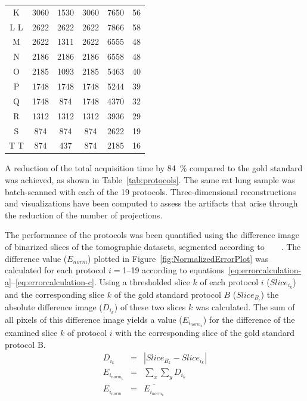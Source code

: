 \begin{table}
\begin{tabular}{cccccc}
		K & 3060 & 1530 & 3060 & 7650  &  56\\%
		\ifiucr
			\rowcolor{lightgray} L 
		\else
		 	L
		 \fi
		 & 2622 & 2622 & 2622 & 7866  &  58\\%
		M & 2622 & 1311 & 2622 & 6555  &  48\\%
		N & 2186 & 2186 & 2186 & 6558  &  48\\%
		O & 2185 & 1093 & 2185 & 5463  &  40\\%
		P & 1748 & 1748 & 1748 & 5244  &  39\\%
		Q & 1748 & 874  & 1748 & 4370  &  32\\%
		R & 1312 & 1312 & 1312 & 3936  &  29\\%
		S & 874  & 874  & 874  & 2622  &  19\\%
		\ifiucr
			\rowcolor{lightgray} T
		\else
		 	T
		 \fi
		& 874  & 437  & 874  & 2185  &  16\\%
	\end{tabular}%
\end{table}

A reduction of the total acquisition time by \SI{84}{\percent} compared to the gold standard was achieved, as shown in Table~\ref{tab:protocols}. The same rat lung sample was batch-scanned with each of the 19 protocols. Three-dimensional reconstructions and visualizations have been computed to assess the artifacts that arise through the reduction of the number of projections.

The performance of the protocols was been quantified using the difference image of binarized slices of the tomographic datasets, segmented according to%
\ifhtml%
	~\citet{Otsu1979}%
\else%
	~%
\fi%
. The difference value ($E_{norm}$) plotted in Figure~\ref{fig:NormalizedErrorPlot} was calculated for each protocol $i=$1--19 according to equations~\ref{eq:errorcalculation-a}--\ref{eq:errorcalculation-c}. Using a thresholded slice $k$ of each protocol $i$ ($Slice_{i_{k}}$) and the corresponding slice $k$ of the gold standard protocol $B$ ($Slice_{B_{i}}$) the absolute difference image ($D_{i_{k}}$) of these two slices $k$ was calculated. The sum of all pixels of this difference image yields a value ($E_{i_{norm_{k}}}$) for the difference of the examined slice $k$ of protocol $i$ with the corresponding slice of the gold standard protocol B.
\begin{eqnarray}%
	D_{i_{k}} &=& |Slice_{B_{k}}-Slice_{i_{k}}|\label{eq:errorcalculation-a}\\%
	E_{i_{norm_{k}}} &=& \sum_{x}\sum_{y} D_{i_{k}}\label{eq:errorcalculation-b}\\%
	E_{i_{norm}} &=& \overline{E_{i_{norm_{k}}}}\label{eq:errorcalculation-c}%
\end{eqnarray}%


